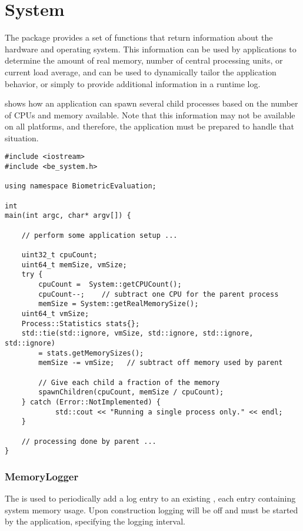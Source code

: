 %
%
\chapter{System}
\label{chp-system}
The  package provides a set of functions that
return information about the hardware and operating system. This information
can be used by applications to determine the amount of real memory, number of
central processing units, or current load average, and can be
used to dynamically tailor the application behavior, or simply to provide
additional information in a runtime log.

 shows how an application can spawn several child
processes based on the number of CPUs and memory available. Note that this
information may not be available on all platforms, and therefore, the
application must be prepared to handle that situation.

\begin{lstlisting}[caption={Using the \namespace{System} CPU Count Information}, label=lst:cpucountuse]
#include <iostream>
#include <be_system.h>

using namespace BiometricEvaluation;

int
main(int argc, char* argv[]) {

    // perform some application setup ...

    uint32_t cpuCount;
    uint64_t memSize, vmSize;
    try {
        cpuCount =  System::getCPUCount();
        cpuCount--;    // subtract one CPU for the parent process
        memSize = System::getRealMemorySize();
	uint64_t vmSize;
	Process::Statistics stats{};
	std::tie(std::ignore, vmSize, std::ignore, std::ignore, std::ignore)
	    = stats.getMemorySizes();
        memSize -= vmSize;   // subtract off memory used by parent

        // Give each child a fraction of the memory
        spawnChildren(cpuCount, memSize / cpuCount);
    } catch (Error::NotImplemented) {
            std::cout << "Running a single process only." << endl;
    }

    // processing done by parent ...
}

\end{lstlisting}

\subsection{MemoryLogger}
\label{sec-memorylogger}
The  is used to periodically add a log entry to an
existing , each entry containing system memory usage. Upon
construction logging will be off and must be started by the application,
specifying the logging interval.

